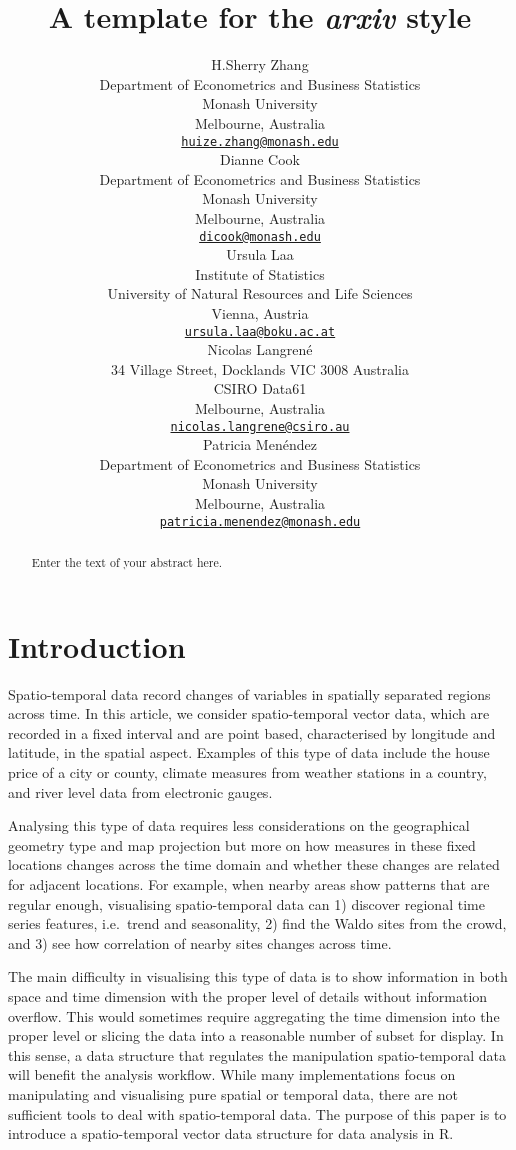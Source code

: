\documentclass{article}
\title{A template for the \emph{arxiv} style}
\author{
    H.Sherry Zhang
   \\
    Department of Econometrics and Business Statistics \\
    Monash University \\
  Melbourne, Australia \\
  \texttt{\href{mailto:huize.zhang@monash.edu}{\nolinkurl{huize.zhang@monash.edu}}} \\
   \And
    Dianne Cook
   \\
    Department of Econometrics and Business Statistics \\
    Monash University \\
  Melbourne, Australia \\
  \texttt{\href{mailto:dicook@monash.edu}{\nolinkurl{dicook@monash.edu}}} \\
   \And
    Ursula Laa
   \\
    Institute of Statistics \\
    University of Natural Resources and Life Sciences \\
  Vienna, Austria \\
  \texttt{\href{mailto:ursula.laa@boku.ac.at}{\nolinkurl{ursula.laa@boku.ac.at}}} \\
   \And
    Nicolas Langrené
   \\
    34 Village Street, Docklands VIC 3008 Australia \\
    CSIRO Data61 \\
  Melbourne, Australia \\
  \texttt{\href{mailto:nicolas.langrene@csiro.au}{\nolinkurl{nicolas.langrene@csiro.au}}} \\
   \And
    Patricia Menéndez
   \\
    Department of Econometrics and Business Statistics \\
    Monash University \\
  Melbourne, Australia \\
  \texttt{\href{mailto:patricia.menendez@monash.edu}{\nolinkurl{patricia.menendez@monash.edu}}} \\
  }
\begin{document}
\maketitle

\def\tightlist{}


\begin{abstract}
Enter the text of your abstract here.
\end{abstract}


\hypertarget{introduction}{%
\section{Introduction}\label{introduction}}

Spatio-temporal data record changes of variables in spatially separated
regions across time. In this article, we consider spatio-temporal vector
data, which are recorded in a fixed interval and are point based,
characterised by longitude and latitude, in the spatial aspect. Examples
of this type of data include the house price of a city or county,
climate measures from weather stations in a country, and river level
data from electronic gauges.

Analysing this type of data requires less considerations on the
geographical geometry type and map projection but more on how measures
in these fixed locations changes across the time domain and whether
these changes are related for adjacent locations. For example, when
nearby areas show patterns that are regular enough, visualising
spatio-temporal data can 1) discover regional time series features,
i.e.~trend and seasonality, 2) find the Waldo sites from the crowd, and
3) see how correlation of nearby sites changes across time.

The main difficulty in visualising this type of data is to show
information in both space and time dimension with the proper level of
details without information overflow. This would sometimes require
aggregating the time dimension into the proper level or slicing the data
into a reasonable number of subset for display. In this sense, a data
structure that regulates the manipulation spatio-temporal data will
benefit the analysis workflow. While many implementations focus on
manipulating and visualising pure spatial or temporal data, there are
not sufficient tools to deal with spatio-temporal data. The purpose of
this paper is to introduce a spatio-temporal vector data structure for
data analysis in R.
\end{document}
